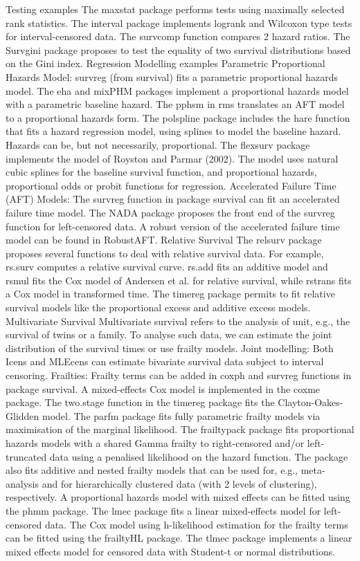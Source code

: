 Testing examples
The maxstat package performs tests using maximally selected rank statistics. 
The interval package implements logrank and Wilcoxon type tests for interval-censored data. 
The survcomp function compares 2 hazard ratios. 
The Survgini package proposes to test the equality of two survival distributions based on the Gini index. 
Regression Modelling examples
Parametric Proportional Hazards Model: survreg (from survival) fits a parametric proportional hazards model. The eha and mixPHM packages implement a proportional hazards model with a parametric baseline hazard. The pphsm in rms translates an AFT model to a proportional hazards form. The polspline package includes the hare function that fits a hazard regression model, using splines to model the baseline hazard. Hazards can be, but not necessarily, proportional. The flexsurv package implements the model of Royston and Parmar (2002). The model uses natural cubic splines for the baseline survival function, and proportional hazards, proportional odds or probit functions for regression. 
Accelerated Failure Time (AFT) Models: The survreg function in package survival can fit an accelerated failure time model. The NADA package proposes the front end of the survreg function for left-censored data. A robust version of the accelerated failure time model can be found in RobustAFT. 
Relative Survival 
The relsurv package proposes several functions to deal with relative survival data. For example, rs.surv computes a relative survival curve. rs.add fits an additive model and rsmul fits the Cox model of Andersen et al. for relative survival, while rstrans fits a Cox model in transformed time. 
The timereg package permits to fit relative survival models like the proportional excess and additive excess models. 
Multivariate Survival 
Multivariate survival refers to the analysis of unit, e.g., the survival of twins or a family. To analyse such data, we can estimate the joint distribution of the survival times or use frailty models. 
Joint modelling: Both Icens and MLEcens can estimate bivariate survival data subject to interval censoring. 
Frailties: Frailty terms can be added in coxph and survreg functions in package survival. A mixed-effects Cox model is implemented in the coxme package. The two.stage function in the timereg package fits the Clayton-Oakes-Glidden model. The parfm package fits fully parametric frailty models via maximisation of the marginal likelihood. The frailtypack package fits proportional hazards models with a shared Gamma frailty to right-censored and/or left-truncated data using a penalised likelihood on the hazard function. The package also fits additive and nested frailty models that can be used for, e.g., meta-analysis and for hierarchically clustered data (with 2 levels of clustering), respectively. A proportional hazards model with mixed effects can be fitted using the phmm package. The lmec package fits a linear mixed-effects model for left-censored data. The Cox model using h-likelihood estimation for the frailty terms can be fitted using the frailtyHL package. The tlmec package implements a linear mixed effects model for censored data with Student-t or normal distributions. 
 


